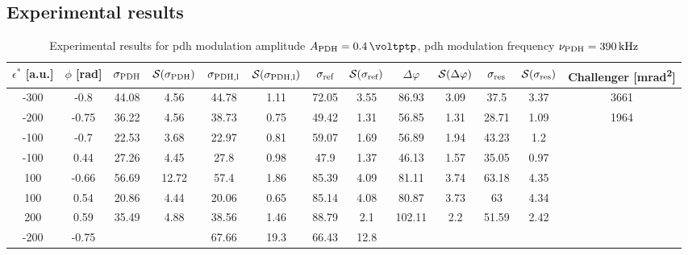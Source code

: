 \begin{landscape}
	\chapter{Experimental results}
	
	\label{app-exp}
	
	
	\begin{table}
	\centering
	\begin{tabular}{|c|c|c|c|c|c|c|c|c|c|c|c|c|}
		\hline
		$\epsilon^*$ [a.u.] & $\phi$ [\si{\radian}] & $\sigma_{\text{PDH}}$ & $\mathcal{S}(\sigma_{\text{PDH}})$ & $\sigma_{\text{PDH,l}}$ & $\mathcal{S}(\sigma_{\text{PDH,l}})$  & $\sigma_{\text{ref}}$ & $\mathcal{S}(\sigma_{\text{ref}})$ & $\Delta \varphi$ & $\mathcal{S}(\Delta \varphi)$ & $\sigma_{\text{res}}$  & $\mathcal{S}(\sigma_{\text{res}})$ & Challenger [\si{\milli\radian\squared}] \\
		\hline
		\hline
		-300 & -0.8 & 44.08 & 4.56 & 44.78 & 1.11 & 72.05 & 3.55 & 86.93 & 3.09 & 37.5 & 3.37 & 3661\\
		-200 & -0.75 & 36.22 & 4.56 & 38.73 & 0.75 & 49.42 & 1.31 & 56.85 & 1.31 & 28.71 & 1.09 & 1964\\
		-100 & -0.7 & 22.53 & 3.68 & 22.97 & 0.81 & 59.07 & 1.69 & 56.89 & 1.94 & 43.23 & 1.2 & \\
		-100 & 0.44 & 27.26 & 4.45 & 27.8 & 0.98 & 47.9 & 1.37 & 46.13 & 1.57 & 35.05 & 0.97 & \\
		100 & -0.66 & 56.69 & 12.72 & 57.4 & 1.86 & 85.39 & 4.09 & 81.11 & 3.74 & 63.18 & 4.35 & \\
		100 & 0.54 & 20.86 & 4.44 & 20.06 & 0.65 & 85.14 & 4.08 & 80.87 & 3.73 & 63 & 4.34 & \\
		200 & 0.59 & 35.49 & 4.88 & 38.56 & 1.46 & 88.79 & 2.1 & 102.11 & 2.2 & 51.59 & 2.42 & \\
		\hline
		\hline
		-200 & -0.75 & & & 67.66 & 19.3 & 66.43 & 12.8 & & & & & \\
		\hline
	\end{tabular}
	\caption{Experimental results for \gls{pdh} modulation amplitude $\tind{A}{PDH} = \SI{0.4}{\voltptp}$, \gls{pdh} modulation frequency $\nu_{\text{PDH}} = \SI{390}{\kilo\hertz}$}
	\end{table}
	
	

\end{landscape}

